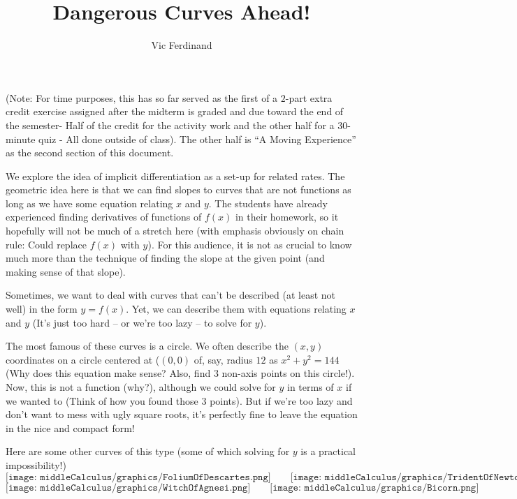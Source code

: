 \documentclass[handout]{ximera}
\author{Vic Ferdinand}
\title{Dangerous Curves Ahead!}
\begin{document}
\begin{abstract}
\end{abstract}
\maketitle

\begin{instructorIntro}

(Note: For time purposes, this has so far served as the first of a $2$-part extra credit exercise assigned after the midterm is graded and due toward the end of the semester- Half of the credit for the activity work and the other half for a $30$-minute quiz - All done outside of class).  The other half is ``A Moving Experience'' as the second section of this document.


We explore the idea of implicit differentiation as a set-up for related rates.  The geometric idea here is that we can find slopes to curves that are not functions as long as we have some equation relating $x$ and $y$.  The students have already experienced finding derivatives of functions of $f(x)$ in their homework, so it hopefully will not be much of a stretch here (with emphasis obviously on chain rule:  Could replace $f(x)$ with $y$).  For this audience, it is not as crucial to know much more than the technique of finding the slope at the given point (and making sense of that slope).
\end{instructorIntro}



Sometimes, we want to deal with curves that can't be described (at least not well) in the form  $y=f(x)$.  Yet, we can describe them with equations relating $x$ and $y$ (It's just too hard – or we’re too lazy – to solve for $y$).

 The most famous of these curves is a circle.  We often describe the $(x, y)$ coordinates on a circle centered at ($(0, 0)$ of, say, radius $12$ as $x^2+y^2=144$ (Why does this equation make sense?  Also, find $3$ non-axis points on this circle!).  Now, this is not a function (why?), although we could solve for $y$ in terms of $x$ if we wanted to (Think of how you found those $3$ points).  But if we're too lazy and don't want to mess with ugly square roots, it's perfectly fine to leave the equation in the nice and compact  form!
 
Here are some other curves of this type (some of which solving for $y$ is a practical impossibility!)
\[
\texttt{[image: middleCalculus/graphics/FoliumOfDescartes.png]} \qquad
\texttt{[image: middleCalculus/graphics/TridentOfNewton.png]}
\]
\[
\texttt{[image: middleCalculus/graphics/WitchOfAgnesi.png]} \qquad
\texttt{[image: middleCalculus/graphics/Bicorn.png]}
\]
\end{document}
